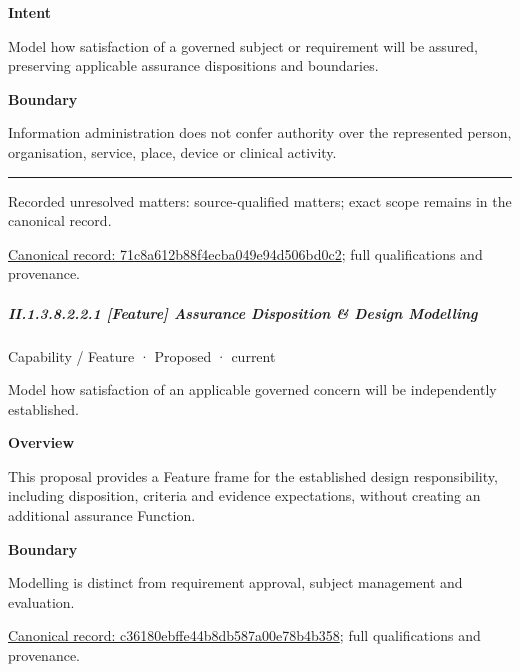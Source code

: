 \textbf{Intent}



Model how satisfaction of a governed subject or requirement will be assured, preserving applicable assurance dispositions and boundaries.



\textbf{Boundary}



Information administration does not confer authority over the represented person, organisation, service, place, device or clinical activity.



\medskip\hrule\medskip

{\small Recorded unresolved matters: source-qualified matters; exact scope remains in the canonical record.}\par
{\footnotesize \href{../../../../../../../continuum/strategy/capability/71c8a612b88f4ecba049e94d506bd0c2.md}{Canonical record: 71c8a612b88f4ecba049e94d506bd0c2}; full qualifications and provenance.}\par
\subparagraph*{II.1.3.8.2.2.1 [Feature] Assurance Disposition \& Design Modelling}
\label{navigation:II.1.3.8.2.2.1}

\label{element:c36180ebffe44b8db587a00e78b4b358}
{\small Capability / Feature · Proposed · current}\par

Model how satisfaction of an applicable governed concern will be independently established.



\textbf{Overview}



This proposal provides a Feature frame for the established design responsibility, including disposition, criteria and evidence expectations, without creating an additional assurance Function.



\textbf{Boundary}



Modelling is distinct from requirement approval, subject management and evaluation.


{\footnotesize \href{../../../../../../../continuum/strategy/capability/feature/c36180ebffe44b8db587a00e78b4b358.md}{Canonical record: c36180ebffe44b8db587a00e78b4b358}; full qualifications and provenance.}\par

